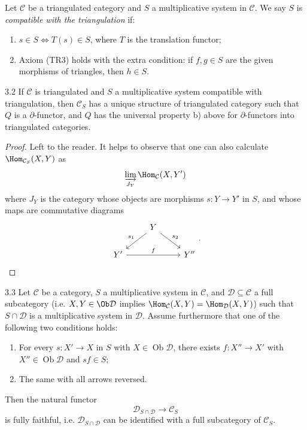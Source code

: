 \begin{definition*}
Let $\mathcal{C}$ be a triangulated category and $S$ a multiplicative system in $\mathcal{C}$. We say $S$ is \emph{compatible with the triangulation} if:
\begin{enumerate}
\item[(FR4)] $s\in S \iff T(s)\in S$, where $T$ is the translation functor;
\item[(FR5)] Axiom (TR3) holds with the extra condition: if $f,g\in S$ are the given morphisms of triangles, then  $h\in S$.
\end{enumerate}
\end{definition*}

\begin{bookproposition}{3.2}\label{prop:1.3.2}
If $\mathcal{C}$ is triangulated and $S$ a multiplicative system compatible with triangulation, then $\mathcal{C}_S$ has a unique structure of triangulated category such
that $Q$ is a $\partial$-functor, and $Q$ has the universal property b)
above for $\partial$-functors into triangulated categories.
\end{bookproposition}

\begin{proof}
	Left to the reader. It helps to observe that one can also calculate $\Hom_{\mathcal{C}_S}(X,Y)$ as
	\[
	\varinjlim_{J_Y} \Hom_{\mathcal{C}}(X,Y')
	\]
	where $J_Y$ is the category whose objects are morphisms $s: Y \longrightarrow Y'$ in $S$, and whose maps are commutative diagrams
	\[
	\begin{tikzcd}
		& Y \arrow[ld, "s_1"'] \arrow[rd, "s_2"] & \\
		Y' \arrow[rr, "f"] & & Y''
	\end{tikzcd}
	.
	\]
\end{proof}

\begin{bookproposition}{3.3}\label{prop:1.3.3}
Let $\mathcal{C}$ be a category, $S$ a multiplicative system in $\mathcal{C}$, and $\mathcal{D}\subseteq\mathcal{C}$ a full subcategory (i.e. $X,Y\in \Ob \mathcal{D}$ implies $\Hom_{\mathcal{C}}(X,Y)=\Hom_{\mathcal{D}}(X,Y)$) such that $S\cap\mathcal{D}$ is a multiplicative system in $\mathcal{D}$. Assume furthermore
that one of the following two conditions holds:
\begin{enumerate}
\item[(i)] For every $s\colon X'\to X$ in $S$ with $X\in\operatorname{Ob}\mathcal{D}$, there exists $f\colon X''\to X'$ with $X''\in\operatorname{Ob}\mathcal{D}$ and $sf\in S$;
\item[(ii)] The same with all arrows reversed.
\end{enumerate}
Then the natural functor
\[
\mathcal{D}_{S\cap\mathcal{D}} \to \mathcal{C}_S
\]
is fully faithful, i.e. $\mathcal{D}_{S\cap\mathcal{D}}$ can be identified with a full subcategory of $\mathcal{C}_S$.
\end{bookproposition}

